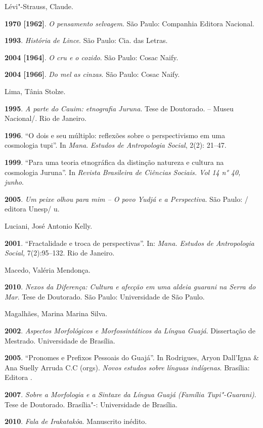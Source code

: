\begin{Parskip}
Lévi"-Strauss, Claude.

\textbf{1970 {[}1962{]}}. \emph{O pensamento selvagem}. São Paulo:
Companhia Editora Nacional.

\textbf{1993}. \emph{História de Lince}. São Paulo: Cia. das Letras.

\textbf{2004 {[}1964{]}}. \emph{O cru e o cozido}. São Paulo: Cosac
Naify.

\textbf{2004 {[}1966{]}}. \emph{Do mel as cinzas}. São Paulo: Cosac
Naify.

Lima, Tânia Stolze.

\textbf{1995}. \emph{A parte do Cauim: etnografia Juruna}. Tese de
Doutorado.  -- Museu Nacional/. Rio de Janeiro.

\textbf{1996}. ``O dois e seu múltiplo: reflexões sobre o perspectivismo
em uma cosmologia tupi''. In \emph{Mana}. \emph{Estudos de Antropologia
Social}, 2(2): 21--47.

\textbf{1999}. ``Para uma teoria etnográfica da distinção natureza e
cultura na cosmologia Juruna''. In \emph{Revista Brasileira de Ciências
Sociais. Vol 14 n° 40, junho}.

\textbf{2005}. \emph{Um peixe olhou para mim -- O povo Yudjá e a
Perspectiva}. São Paulo: / editora Unesp/ u.

Luciani, José Antonio Kelly.

\textbf{2001}. ``Fractalidade e troca de perspectivas''. In: \emph{Mana.
Estudos de Antropologia Social,} 7(2):95--132. Rio de Janeiro.

Macedo, Valéria Mendonça.

\textbf{2010}. \emph{Nexos da Diferença: Cultura e afecção em uma aldeia
guarani na Serra do Mar}. Tese de Doutorado. São Paulo: Universidade de
São Paulo.

Magalhães, Marina Marina Silva.

\textbf{2002}. \emph{Aspectos Morfológicos e Morfossintáticos da Língua
Guajá}. Dissertação de Mestrado. Universidade de Brasília.

\textbf{2005}. ``Pronomes e Prefixos Pessoais do Guajá''. In Rodrigues,
Aryon Dall'Igna \& Ana Suelly Arruda C.C (orgs). \emph{Novos estudos
sobre línguas indígenas}. Brasília: Editora .

\textbf{2007}. \emph{Sobre a Morfologia e a Sintaxe da Língua Guajá
(Família Tupi"-Guarani)}. Tese de Doutorado. Brasília"-: Universidade de
Brasília.

\textbf{2010}. \emph{Fala de Irakatakôa}. Manuscrito inédito.


\end{Parskip}
